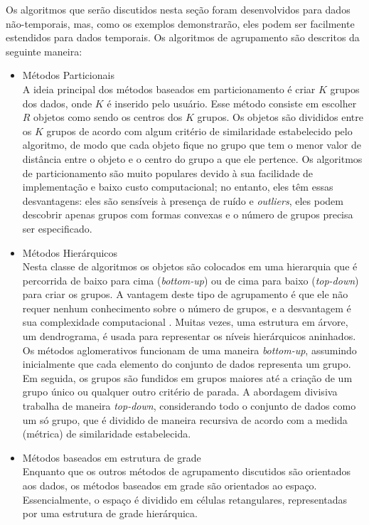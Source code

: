 Os algoritmos que serão discutidos nesta seção foram desenvolvidos para dados não-temporais, mas, como os exemplos demonstrarão, eles podem ser facilmente estendidos para dados temporais. Os algoritmos de agrupamento são descritos da seguinte maneira:

\begin{itemize}
	\item Métodos Particionais\\
        A ideia principal dos métodos baseados em particionamento é criar ${K}$ grupos dos dados, onde ${K}$ é inserido pelo usuário.
        Esse método consiste em escolher ${R}$ objetos como sendo os centros dos ${K}$ grupos.
        Os objetos são divididos entre os ${K}$ grupos de acordo com algum critério de similaridade
        estabelecido pelo algoritmo, de modo que cada objeto fique no grupo que tem o menor valor de
        distância entre o objeto e o centro do grupo a que ele pertence.
        Os algoritmos de particionamento são muito populares devido à sua facilidade de implementação e baixo custo computacional; no entanto, eles têm essas desvantagens: eles são sensíveis à presença de ruído e \textit{outliers}, eles podem descobrir apenas grupos com formas convexas e o número de grupos precisa ser especificado.
	\item Métodos Hierárquicos\\
        Nesta classe de algoritmos os objetos são colocados em uma hierarquia que é percorrida de baixo para cima (\textit{bottom-up}) ou de cima para baixo (\textit{top-down}) para criar os grupos. A vantagem deste tipo de agrupamento é que ele não requer nenhum conhecimento sobre o número de grupos, e a desvantagem é sua complexidade computacional \cite{Lin2004}. Muitas vezes, uma estrutura em árvore, um dendrograma, é usada para representar os níveis hierárquicos aninhados.
        Os métodos aglomerativos funcionam de uma maneira \textit{bottom-up},
        assumindo inicialmente que cada elemento do conjunto de dados representa um grupo. Em seguida, os grupos são fundidos em grupos maiores até a criação de um grupo único ou qualquer outro critério de parada.
        A abordagem divisiva trabalha de maneira \textit{top-down}, considerando todo o conjunto de dados como um só grupo, que é dividido de maneira recursiva de acordo com a medida (métrica) de similaridade estabelecida.
	\item Métodos baseados em estrutura de grade\\
        Enquanto que os outros métodos de agrupamento discutidos são orientados aos dados, os métodos baseados em grade são orientados ao espaço. Essencialmente, o espaço é dividido em células retangulares, representadas por uma estrutura de grade hierárquica.

\end{itemize}

